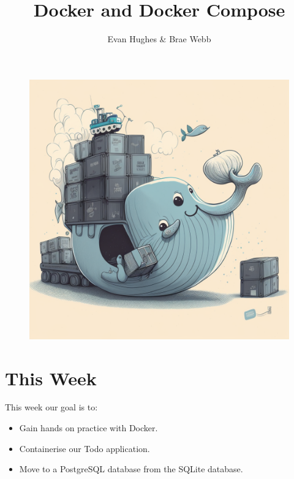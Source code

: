 \documentclass{csse4400}
\title{Docker and Docker Compose}
\author{Evan Hughes \& Brae Webb}
\date{\week[practical]{3}}
\begin{document}
\maketitle

\begin{figure}[h]
  \begin{center}
    \includegraphics[scale=0.4]{images/docker}
  \end{center}
\end{figure}

\section{This Week}
This week our goal is to:
\begin{itemize}
  \item Gain hands on practice with Docker.
  \item Containerise our Todo application.
  \item Move to a PostgreSQL database from the SQLite database.
\end{itemize}

\pagebreak
\end{document}
